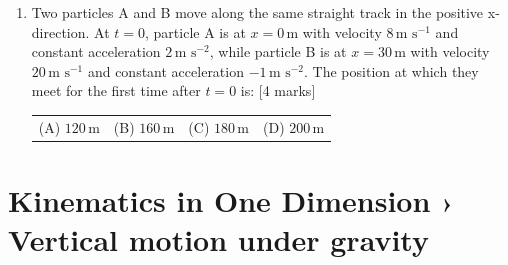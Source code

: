 \documentclass[11pt,a4paper]{article}
\begin{document}
\begin{enumerate}[resume]
\item Two particles A and B move along the same straight track in the positive x-direction. At $t=0$, particle A is at $x=0\,\text{m}$ with velocity $8\,\text{m s}^{-1}$ and constant acceleration $2\,\text{m s}^{-2}$, while particle B is at $x=30\,\text{m}$ with velocity $20\,\text{m s}^{-1}$ and constant acceleration $-1\,\text{m s}^{-2}$. The position at which they meet for the first time after $t=0$ is: \hfill [4 marks]
{\renewcommand{\arraystretch}{1.8}
\begin{tabularx}{\linewidth}{X X X X}
(A) \quad $120\,\text{m}$ & (B) \quad $160\,\text{m}$ & (C) \quad $180\,\text{m}$ & (D) \quad $200\,\text{m}$ \\[10pt]
\end{tabularx}}
\end{enumerate}
\section*{Kinematics in One Dimension › Vertical motion under gravity}
\end{document}
